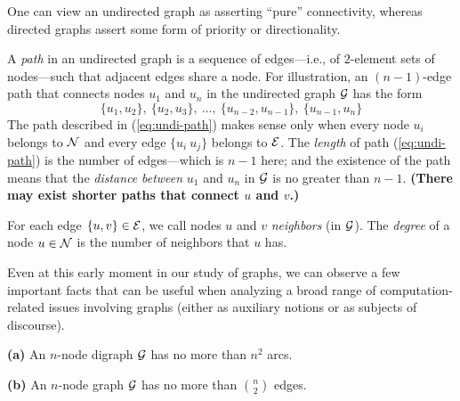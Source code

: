 One can view an undirected graph as asserting ``pure'' connectivity,
whereas directed graphs assert some form of priority or directionality.

A {\it path} in an undirected graph 
 
is a sequence of edges---i.e., of $2$-element sets of nodes---such
that adjacent edges share a node.  For illustration, an $(n-1)$-edge
path that connects nodes $u_1$ and $u_n$ in the undirected graph $\mbox{$\cal G$}$
has the form
\begin{equation}
\label{eq:undi-path}
\{u_1, u_2\}, \ \{u_2, u_3\}, \ \ldots, \ \{u_{n-2}, u_{n-1}\}, \ \{u_{n-1}, u_{n}\}
\end{equation}
The path described in (\ref{eq:undi-path}) makes sense only when every
node $u_i$ belongs to $\mbox{$\cal N$}$ and every edge $\{u_i \ u_j\}$ belongs
to $\mbox{$\cal E$}$.  The {\it length} of path (\ref{eq:undi-path}) is the
number of edges---which is $n-1$ here; and the existence of
the path means that the {\it distance}  
{\it between} $u_1$ and $u_n$ in $\mbox{$\cal G$}$ is no greater than $n-1$.  
\textbf{(There
may exist shorter paths that connect $u$ and $v$.)}
\medskip

For each edge $\{u,v\} \in \mbox{$\cal E$}$, we call nodes $u$ and $v$ {\it neighbors} (in $\mbox{$\cal G$}$).
The {\it degree}
of a node $u \in \mbox{$\cal N$}$ is the number of neighbors that $u$ has.

Even at this early moment in our study of graphs, we can observe a few
important facts that can be useful when analyzing a broad range of
computation-related issues involving graphs (either as auxiliary
notions or as subjects of discourse).

\begin{prop}
\label{thm:number-edges/arcs}
{\bf (a)}
An $n$-node digraph $\mbox{$\cal G$}$ has no more than $n^2$ arcs.

{\bf (b)}
An $n$-node graph $\mbox{$\cal G$}$ has no more than $\displaystyle {n \choose 2}$ edges.
\end{prop}

